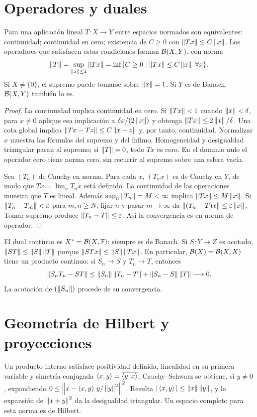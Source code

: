 \section{Operadores y duales}
\begin{teorema}\label{v3:acotacion}
Para una aplicación lineal $T:X\to Y$ entre espacios normados son equivalentes: continuidad; continuidad en cero; existencia de $C\geq0$ con $\left\lVert Tx\right\rVert\leq C\left\lVert x\right\rVert$. Los operadores que satisfacen estas condiciones forman $\mathcal B(X,Y)$, con norma
\[
 \left\lVert T\right\rVert=\sup_{\left\lVert x\right\rVert\leq1}\left\lVert Tx\right\rVert=\inf\{C\geq0:\left\lVert Tx\right\rVert\leq C\left\lVert x\right\rVert\ \forall x\}.
\]
Si $X\ne\{0\}$, el supremo puede tomarse sobre $\left\lVert x\right\rVert=1$. Si $Y$ es de Banach, $\mathcal B(X,Y)$ también lo es.
\end{teorema}
\begin{proof}
La continuidad implica continuidad en cero. Si $\left\lVert Tx\right\rVert<1$ cuando $\left\lVert x\right\rVert<\delta$, para $x\ne0$ aplique esa implicación a $\delta x/(2\left\lVert x\right\rVert)$ y obtenga $\left\lVert Tx\right\rVert\leq2\left\lVert x\right\rVert/\delta$. Una cota global implica $\left\lVert Tx-Tz\right\rVert\leq C\left\lVert x-z\right\rVert$ y, por tanto, continuidad. Normalizar $x$ muestra las fórmulas del supremo y del ínfimo. Homogeneidad y desigualdad triangular pasan al supremo; si $\left\lVert T\right\rVert=0$, todo $Tx$ es cero. En el dominio nulo el operador cero tiene norma cero, sin recurrir al supremo sobre una esfera vacía.

Sea $(T_n)$ de Cauchy en norma. Para cada $x$, $(T_nx)$ es de Cauchy en $Y$, de modo que $Tx=\lim_nT_nx$ está definido. La continuidad de las operaciones muestra que $T$ es lineal. Además $\sup_n\left\lVert T_n\right\rVert=M<\infty$ implica $\left\lVert Tx\right\rVert\leq M\left\lVert x\right\rVert$. Si $\left\lVert T_n-T_m\right\rVert<\varepsilon$ para $m,n\geq N$, fijar $n$ y pasar $m\to\infty$ da $\left\lVert(T_n-T)x\right\rVert\leq\varepsilon\left\lVert x\right\rVert$. Tomar supremo produce $\left\lVert T_n-T\right\rVert\leq\varepsilon$. Así la convergencia es en norma de operador.
\end{proof}
El dual continuo es $X^*=\mathcal B(X,\mathbb F)$; siempre es de Banach. Si $S:Y\to Z$ es acotado, $\left\lVert ST\right\rVert\leq\left\lVert S\right\rVert\left\lVert T\right\rVert$ porque $\left\lVert STx\right\rVert\leq\left\lVert S\right\rVert\left\lVert Tx\right\rVert$. En particular, $\mathcal B(X)=\mathcal B(X,X)$ tiene un producto continuo: si $S_n\to S$ y $T_n\to T$, entonces
\[
 \left\lVert S_nT_n-ST\right\rVert\leq\left\lVert S_n\right\rVert\left\lVert T_n-T\right\rVert+\left\lVert S_n-S\right\rVert\left\lVert T\right\rVert\longrightarrow0.
\]
La acotación de $(\left\lVert S_n\right\rVert)$ procede de su convergencia.

\section{Geometría de Hilbert y proyecciones}
Un producto interno satisface positividad definida, linealidad en su primera variable y simetría conjugada $\left\langle x,y\right\rangle=\overline{\left\langle y,x\right\rangle}$. Cauchy--Schwarz se obtiene, si $y\ne0$, expandiendo $0\leq\left\lVert x-\left\langle x,y\right\rangle\,y/\left\lVert y\right\rVert^2\right\rVert^2$. Resulta $|\left\langle x,y\right\rangle|\leq\left\lVert x\right\rVert\left\lVert y\right\rVert$, y la expansión de $\left\lVert x+y\right\rVert^2$ da la desigualdad triangular. Un espacio completo para esta norma es de Hilbert.

